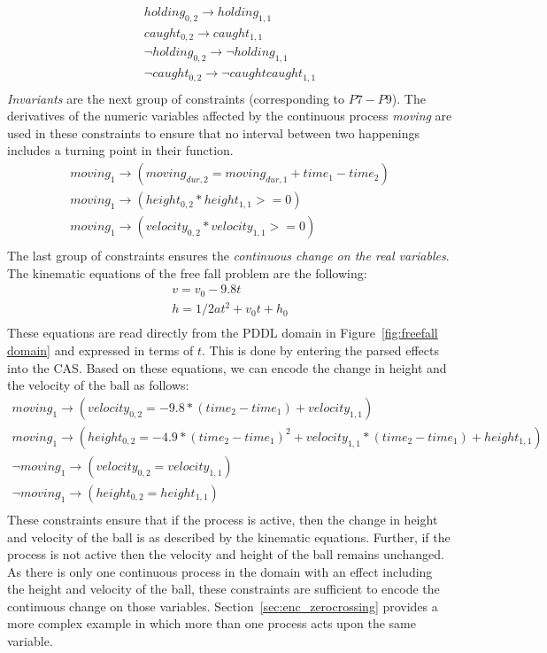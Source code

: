 $$
\begin{array}{l}
holding_{0,2} \rightarrow holding_{1,1}\\
caught_{0,2} \rightarrow caught_{1,1}\\
\neg holding_{0,2} \rightarrow \neg holding_{1,1}\\
\neg caught_{0,2} \rightarrow \neg caught caught_{1,1}\\
\end{array}
$$
\emph{Invariants} are the next group of constraints (corresponding to $P7-P9$). The derivatives of the numeric variables affected by the continuous process \textit{moving} are used in these constraints to ensure that no interval between two happenings includes a turning point in their function.
$$
\begin{array}{l}
moving_{1} \rightarrow (moving_{dur,2} = moving_{dur,1} + time_1 - time_2)\\
moving_{1} \rightarrow (height_{0,2}*height_{1,1} >= 0)\\
moving_{1} \rightarrow (velocity_{0,2}*velocity_{1,1} >= 0)\\
\end{array}
$$
The last group of constraints ensures the \emph{continuous change on the real variables}. The kinematic equations of the free fall problem are the following: 
$$
\begin{array}{l}
v = v_0 - 9.8t\\ 
h = 1/2 {at^{2}} + {v_0}t + h_0 \\
\end{array}
$$
These equations are read directly from the PDDL domain in Figure~\ref{fig:freefall domain} and expressed in terms of $t$. This is done by entering the parsed effects into the CAS. Based on these equations, we can encode the change in height and the velocity of the ball as follows:
$$
\begin{array}{l}
moving_{1} \rightarrow (velocity_{0,2} = -9.8 * (time_2 - time_1) + velocity_{1,1})\\
moving_{1} \rightarrow (height_{0,2} = -4.9 * (time_2 - time_1)^{2} + velocity_{1,1}*(time_2 - time_1) + height_{1,1})\\
\neg moving_{1} \rightarrow (velocity_{0,2} = velocity_{1,1})\\
\neg moving_{1} \rightarrow (height_{0,2} = height_{1,1})\\
\end{array}
$$
These constraints ensure that if the process is active, then the change in height and velocity of the ball is as described by the kinematic equations. Further, if the process is not active then the velocity and height of the ball remains unchanged. As there is only one continuous process in the domain with an effect including the height and velocity of the ball, these constraints are sufficient to encode the continuous change on those variables. Section~\ref{sec:enc_zerocrossing} provides a more complex example in which more than one process acts upon the same variable.

